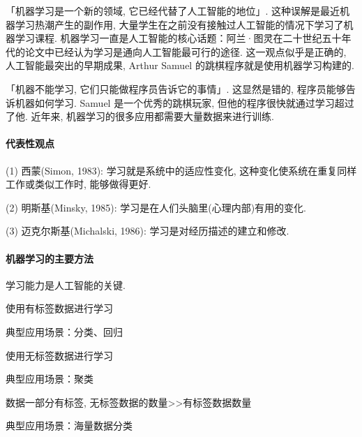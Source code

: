 「机器学习是一个新的领域, 它已经代替了人工智能的地位」. 这种误解是最近机器学习热潮产生的副作用, 大量学生在之前没有接触过人工智能的情况下学习了机器学习课程. 机器学习一直是人工智能的核心话题：阿兰·图灵在二十世纪五十年代的论文中已经认为学习是通向人工智能最可行的途径. 这一观点似乎是正确的, 人工智能最突出的早期成果, Arthur Samuel 的跳棋程序就是使用机器学习构建的.

「机器不能学习, 它们只能做程序员告诉它的事情」. 这显然是错的, 程序员能够告诉机器如何学习. Samuel 是一个优秀的跳棋玩家, 但他的程序很快就通过学习超过了他. 近年来, 机器学习的很多应用都需要大量数据来进行训练.
\paragraph{代表性观点}

    (1) 西蒙(Simon, 1983): 学习就是系统中的适应性变化, 这种变化使系统在重复同样工作或类似工作时, 能够做得更好.

    (2) 明斯基(Minsky, 1985): 学习是在人们头脑里(心理内部)有用的变化.

    (3) 迈克尔斯基(Michalski, 1986): 学习是对经历描述的建立和修改.

\paragraph{机器学习的主要方法}
学习能力是人工智能的关键.
\begin{tcolorbox}[colback=white!50,colframe=orange!50,title=监督学习( Supervised learning)]
\begin{center}
使用有标签数据进行学习

典型应用场景：分类、回归
\hfill
\end{center}
\end{tcolorbox}

\begin{tcolorbox}[colback=white!50,colframe=orange!50,title=非监督学习( Unsupervised learning)]
\begin{center}
使用无标签数据进行学习

典型应用场景：聚类
\hfill
\end{center}
\end{tcolorbox}

\begin{tcolorbox}[colback=white!50,colframe=orange!50,title=半监督学习( Semi-supervised learning)]
\begin{center}
数据一部分有标签, 无标签数据的数量>>有标签数据数量

典型应用场景：海量数据分类
\hfill
\end{center}
\end{tcolorbox}

